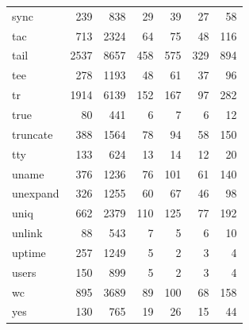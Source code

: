\begin{table}
\begin{tabular}{lrrrrrr}
    sync            & 239        & 838      & 29              & 39              & 27             & 58       \\
    tac             & 713        & 2324     & 64              & 75              & 48             & 116      \\
    tail            & 2537       & 8657     & 458             & 575             & 329            & 894      \\
    tee             & 278        & 1193     & 48              & 61              & 37             & 96       \\
    tr              & 1914       & 6139     & 152             & 167             & 97             & 282      \\
    true            & 80         & 441      & 6               & 7               & 6              & 12       \\
    truncate        & 388        & 1564     & 78              & 94              & 58             & 150      \\
    tty             & 133        & 624      & 13              & 14              & 12             & 20       \\
    uname           & 376        & 1236     & 76              & 101             & 61             & 140      \\
    unexpand        & 326        & 1255     & 60              & 67              & 46             & 98       \\
    uniq            & 662        & 2379     & 110             & 125             & 77             & 192      \\
    unlink          & 88         & 543      & 7               & 5               & 6              & 10       \\
    uptime          & 257        & 1249     & 5               & 2               & 3              & 4        \\
    users           & 150        & 899      & 5               & 2               & 3              & 4        \\
    wc              & 895        & 3689     & 89              & 100             & 68             & 158      \\
    yes             & 130        & 765      & 19              & 26              & 15             & 44       \\
    \bottomrule
    \end{tabular}
    \end{table}

